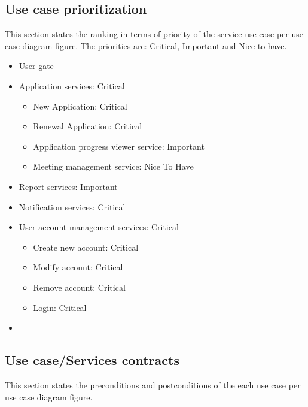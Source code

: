 \documentclass[12pt]{article}
\begin{document}
\subsection{Use case prioritization} %
\vspace{0.2in}
This section states the ranking in terms of priority of the service use case per use case diagram figure. The priorities are: Critical, Important and Nice to have.\\ 
\begin{itemize}
	\item User gate
	\item Application services: Critical
	\begin{itemize}
		\item New Application: Critical
		\item Renewal Application: Critical
		\item Application progress viewer service: Important
		\item Meeting management service: Nice To Have
	\end{itemize}
	\item Report services: Important
	\item Notification services: Critical
	\item User account management services: Critical
	\begin{itemize}
		\item Create new account: Critical
		\item Modify account: Critical
		\item Remove account: Critical
		\item Login: Critical
	\end{itemize}
	\item 
\end{itemize}


\vspace{0.2in}

\subsection{Use case/Services contracts} %
\vspace{0.2in}

This section states the preconditions and postconditions of the each use case per use case diagram figure. \\
\end{document}
